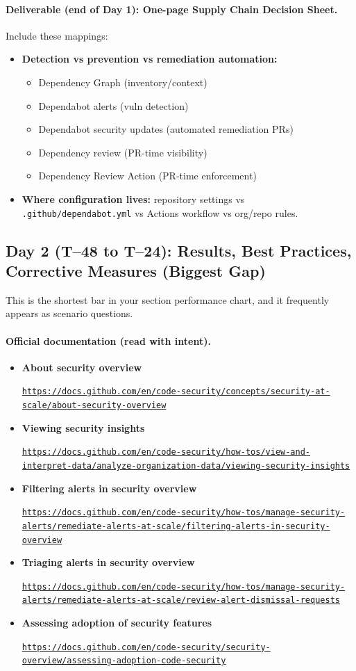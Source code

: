 \documentclass[11pt]{article}
\newcommand{\DocLink}[2]{%
  \item \textbf{#1}\par
  \noindent\href{#2}{\nolinkurl{#2}}%
}
\begin{document}
\paragraph{Deliverable (end of Day 1): One-page Supply Chain Decision Sheet.}
Include these mappings:

\begin{itemize}
  \item \textbf{Detection vs prevention vs remediation automation:}
  \begin{itemize}
    \item Dependency Graph (inventory/context)
    \item Dependabot alerts (vuln detection)
    \item Dependabot security updates (automated remediation PRs)
    \item Dependency review (PR-time visibility)
    \item Dependency Review Action (PR-time enforcement)
  \end{itemize}
  \item \textbf{Where configuration lives:} repository settings vs \texttt{.github/dependabot.yml} vs Actions workflow vs org/repo rules.
\end{itemize}

\clearpage
\subsection*{Day 2 (T--48 to T--24): Results, Best Practices, Corrective Measures (Biggest Gap)}
This is the shortest bar in your section performance chart, and it frequently appears as scenario questions.

\paragraph{Official documentation (read with intent).}
\begin{itemize}
  \DocLink{About security overview}{https://docs.github.com/en/code-security/concepts/security-at-scale/about-security-overview}
  \DocLink{Viewing security insights}{https://docs.github.com/en/code-security/how-tos/view-and-interpret-data/analyze-organization-data/viewing-security-insights}
  \DocLink{Filtering alerts in security overview}{https://docs.github.com/en/code-security/how-tos/manage-security-alerts/remediate-alerts-at-scale/filtering-alerts-in-security-overview}
  \DocLink{Triaging alerts in security overview}{https://docs.github.com/en/code-security/how-tos/manage-security-alerts/remediate-alerts-at-scale/review-alert-dismissal-requests}
  \DocLink{Assessing adoption of security features}{https://docs.github.com/en/code-security/security-overview/assessing-adoption-code-security}
\end{itemize}
\end{document}
